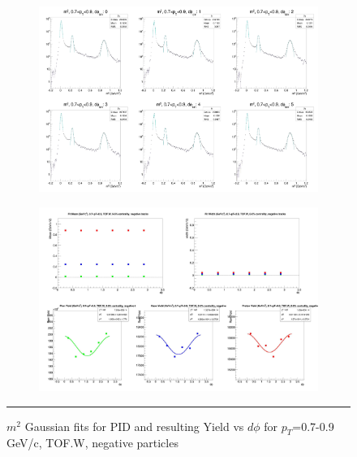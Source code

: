 \begin{figure}[H]
  \centering
    \begin{subfigure}{1\textwidth}
    \includegraphics[width=1\textwidth]{lowptfits/yieldvsdphi_tof1_cent0_ch0_pT-7-9.jpg}
    \end{subfigure}
    \begin{subfigure}{1\textwidth}
    \includegraphics[width=1\textwidth]{lowptfits/fitParams_tof1_cent0_ch0_pT-7-9.jpg}
    \end{subfigure}
    \rule{35em}{0.5pt}
  \caption[PID fits and Yield vs $d\phi$ for $p_T$=0.7-0.9 GeV/c, TOF.W, negative particles ]{$m^2$ Gaussian fits for PID and resulting Yield vs $d\phi$ for $p_T$=0.7-0.9 GeV/c, TOF.W, negative particles}
  \label{fig:fits7-9neg}
\end{figure}

